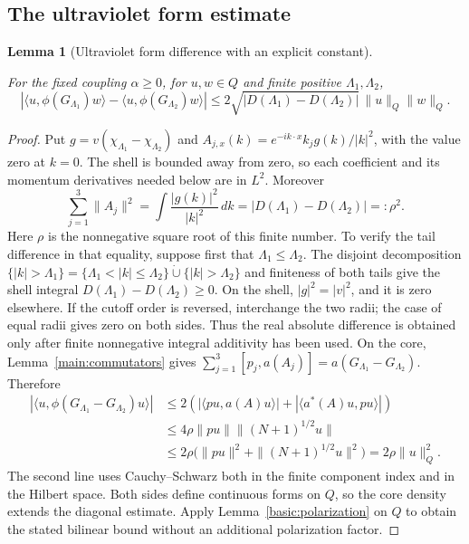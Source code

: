 \documentclass[11pt,a4paper]{article}
\newtheorem{lemma}[theorem]{Lemma}
\theoremstyle{definition}
\theoremstyle{remark}
\newcommand{\proofid}[1]{\par\smallskip{\normalfont\scriptsize\color{inkblue}Stable ID: \nolinkurl{#1}}\par\smallskip}
\begin{document}
\subsection{The ultraviolet form estimate}

\begin{lemma}[Ultraviolet form difference with an explicit constant]
\label{main:uv-form}
\proofid{main:uv-form}
\par{}\par\smallskip

For the fixed coupling $\alpha\geq0$, for $u,w\in Q$ and finite positive
$\Lambda_1,\Lambda_2$,
\[
 \left|\langle u,\phi(G_{\Lambda_1})w\rangle
              -\langle u,\phi(G_{\Lambda_2})w\rangle\right|
 \leq 2\sqrt{|D(\Lambda_1)-D(\Lambda_2)|}\,\|u\|_Q\|w\|_Q.
\]
\end{lemma}
\begin{proof}
Put $g=v(\chi_{\Lambda_1}-\chi_{\Lambda_2})$ and
$A_{j,x}(k)=e^{-ik\cdot x}k_jg(k)/|k|^2$, with the value zero at
$k=0$. The shell is bounded away from zero, so each coefficient and
its momentum derivatives needed below are in $L^2$. Moreover
\[
 \sum_{j=1}^3\|A_j\|^2=\int\frac{|g(k)|^2}{|k|^2}\,dk
                   =|D(\Lambda_1)-D(\Lambda_2)|=:\rho^2.
\]
Here $\rho$ is the nonnegative square root of this finite number.
To verify the tail difference in that equality, suppose first that
$\Lambda_1\leq\Lambda_2$. The disjoint decomposition
$\{|k|>\Lambda_1\}=\{\Lambda_1<|k|\leq\Lambda_2\}
\mathbin{\dot\cup}\{|k|>\Lambda_2\}$ and finiteness of both
tails give the shell integral
$D(\Lambda_1)-D(\Lambda_2)\geq0$. On the shell,
$|g|^2=|v|^2$, and it is zero elsewhere. If the cutoff order is
reversed, interchange the two radii; the case of equal radii gives
zero on both sides. Thus the real absolute difference is obtained
only after finite nonnegative integral additivity has been used.
On the core, Lemma~\ref{main:commutators} gives
$\sum_{j=1}^3[p_j,a(A_j)]=a(G_{\Lambda_1}-G_{\Lambda_2})$. Therefore
\begin{align*}
 |\langle u,\phi(G_{\Lambda_1}-G_{\Lambda_2})u\rangle|
 &\leq2\left(|\langle pu,a(A)u\rangle|
                 +|\langle a^*(A)u,pu\rangle|\right)\\
 &\leq4\rho\|pu\|\|(N+1)^{1/2}u\|\\
 &\leq2\rho\bigl(\|pu\|^2+\|(N+1)^{1/2}u\|^2\bigr)
 =2\rho\|u\|_Q^2.
\end{align*}
The second line uses Cauchy--Schwarz both in the finite component index
and in the Hilbert space. Both sides define continuous forms on $Q$,
so the core density extends the diagonal estimate. Apply
Lemma~\ref{basic:polarization} on $Q$ to obtain the stated bilinear
bound without an additional polarization factor.
\end{proof}
\end{document}
